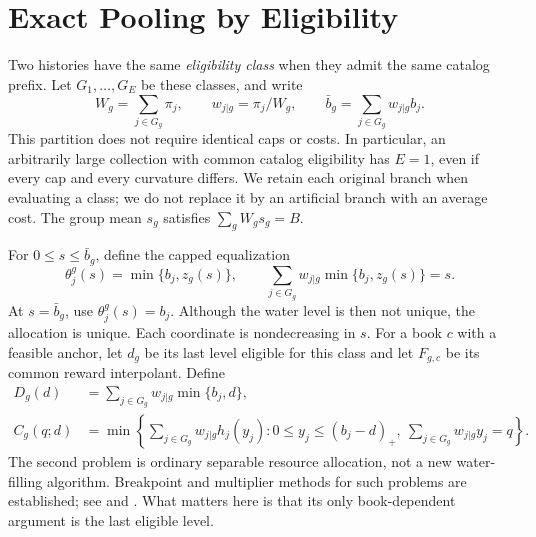 \section{Exact Pooling by Eligibility}\label{sec:r49-pooling}
Two histories have the same \emph{eligibility class} when they admit the same catalog prefix. Let $G_1,\ldots,G_E$ be these classes, and write
\[
 W_g=\sum_{j\in G_g}\pi_j,\qquad
 w_{j|g}=\pi_j/W_g,\qquad
 \bar b_g=\sum_{j\in G_g}w_{j|g}b_j.
\]
This partition does not require identical caps or costs. In particular, an arbitrarily large collection with common catalog eligibility has $E=1$, even if every cap and every curvature differs. We retain each original branch when evaluating a class; we do not replace it by an artificial branch with an average cost. The group mean $s_g$ satisfies $\sum_gW_gs_g=B$.

For $0\leq s\leq\bar b_g$, define the capped equalization
\begin{equation}\label{eq:r49-theta}
 \theta_j^g(s)=\min\{b_j,z_g(s)\},\qquad
 \sum_{j\in G_g}w_{j|g}\min\{b_j,z_g(s)\}=s.
\end{equation}
At $s=\bar b_g$, use $\theta_j^g(s)=b_j$. Although the water level is then not unique, the allocation is unique. Each coordinate is nondecreasing in $s$. For a book $c$ with a feasible anchor, let $d_g$ be its last level eligible for this class and let $F_{g,c}$ be its common reward interpolant. Define
\begin{align}
 D_g(d)&=\sum_{j\in G_g}w_{j|g}\min\{b_j,d\},\label{eq:r49-D}\\
 C_g(q;d)&=\min\left\{\sum_{j\in G_g}w_{j|g}h_j(y_j):
 0\leq y_j\leq(b_j-d)_+,\ \sum_{j\in G_g}w_{j|g}y_j=q\right\}.
 \label{eq:r49-C}
\end{align}
The second problem is ordinary separable resource allocation, not a new water-filling algorithm. Breakpoint and multiplier methods for such problems are established; see \citet{PatrikssonStromberg2015} and \citet{SchootUiterkamp2022}. What matters here is that its only book-dependent argument is the last eligible level.

